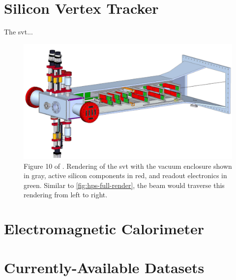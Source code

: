 \section{Silicon Vertex Tracker}
The \ac{svt}...

\begin{figure}
    \centering
    \includegraphics*[width=\textwidth]{figures/hps/experiment/smkcarty-thesis-fig-10-svt-render.png}
    \caption{
        Figure 10 of \cite{skmccarty-thesis-2020}. Rendering of the \ac{svt} with the vacuum
        enclosure shown in gray, active silicon components in red, and readout electronics in
        green. Similar to \cref{fig:hps-full-render}, the beam would traverse this rendering
        from left to right.
    }
    \label{fig:hps-svt-render}
\end{figure}

\section{Electromagnetic Calorimeter}

\section{Currently-Available Datasets}
